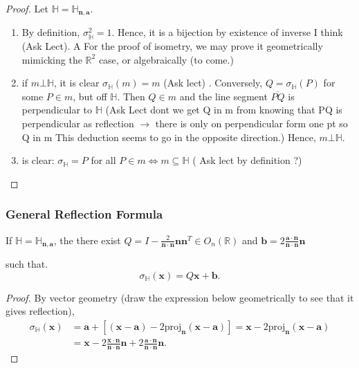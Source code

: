  \begin{proof}
   Let \( \mathbb{H} = \mathbb{H}_{\mathbf{n}, \mathbf{a}} \).

   \begin{enumerate}
     \item By definition, \( \sigma^{2}_{\mathbb{H}} = 1 \). Hence, it is a bijection by existence of inverse I think (Ask Lect). A  
      For the proof of isometry, we may prove it geometrically mimicking the \( \mathbb{R}^{2} \) case, or
        algebraically (to come.)
      \item if \( m \bot \mathbb{H} \), it is clear \( \sigma_{\mathbb{H}}\left( m  \right) = m \) (Ask lect) .
        Conversely, \( Q = \sigma_{\mathbb{H}}\left(P  \right) \) for some
        \( P \in m \), but off \( \mathbb{H} \). Then \( Q \in m \) and the line segment 
        \( \overline{PQ} \) is perpendicular to \( \mathbb{H} \)
        (Ask Lect dont we get Q in m from knowing that PQ is perpendicular as reflection \( \to \) there is only on perpendicular form one pt so Q in m
         This deduction seems to go in the opposite direction.)
        Hence, \( m \bot \mathbb{H} \).
      \item is clear: \( \sigma_{\mathbb{H}}= P  \) for all \( P \in m \iff m \subseteq \mathbb{H} \) ( Ask lect by definition ?)
   \end{enumerate}
  
 \end{proof}

 \subsubsection{General Reflection Formula}
\begin{theorem}
  If \( \mathbb{H} = \mathbb{H}_{\mathbf{n}, \mathbf{a}} \), the there exist \( Q = I - \frac{2}{\mathbf{n} \cdot \mathbf{n}} \mathbf{n} \mathbf{n}^{T} \in O_{n}\left(\mathbb{R}  \right)  \) and \( \mathbf{b} = 2 \frac{\mathbf{a} \cdot \mathbf{n}}{ \mathbf{n} \cdot \mathbf{n}}  \mathbf{n} \)

  such that.
  \[
    \sigma_{\mathbb{H}}\left(\mathbf{x}  \right) = Q \mathbf{x} + \mathbf{b}
  .\] 
\end{theorem}

\begin{proof}
 By vector geometry (draw the expression below geometrically to see that it gives reflection),
 \begin{align}
   \sigma_{\mathbb{H}} \left(\mathbf{x}\right) &= \mathbf{a} + \left[  \left( \mathbf{x} - \mathbf{a} \right) - 2 \text{proj}_{\mathbf{n}} \left( \mathbf{x} - \mathbf{a} \right)\right] = \mathbf{x} - 2 \text{proj}_{\mathbf{n}} \left( \mathbf{x} - \mathbf{a} \right) \\
                       &= \mathbf{x} - 2 \frac{\mathbf{x} \cdot \mathbf{n}}{ \mathbf{n} \cdot \mathbf{n}} \mathbf{n} + 2 \frac{\mathbf{a} \cdot \mathbf{n}}{\mathbf{n} \cdot \mathbf{n}} \mathbf{n}
 .\end{align}
\end{proof}

